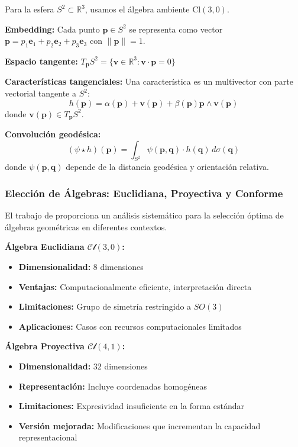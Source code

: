 \begin{example}\label{ex:cnn_sphere_clifford}
Para la esfera $S^2 \subset \mathbb{R}^3$, usamos el álgebra ambiente $\text{Cl}(3,0)$.

\textbf{Embedding:}
Cada punto $\mathbf{p} \in S^2$ se representa como vector $\mathbf{p} = p_1 \mathbf{e}_1 + p_2 \mathbf{e}_2 + p_3 \mathbf{e}_3$ con $\|\mathbf{p}\| = 1$.

\textbf{Espacio tangente:}
$T_\mathbf{p} S^2 = \{\mathbf{v} \in \mathbb{R}^3 : \mathbf{v} \cdot \mathbf{p} = 0\}$

\textbf{Características tangenciales:}
Una característica es un multivector con parte vectorial tangente a $S^2$:
\[h(\mathbf{p}) = \alpha(\mathbf{p}) + \mathbf{v}(\mathbf{p}) + \beta(\mathbf{p}) \mathbf{p} \wedge \mathbf{v}(\mathbf{p})\]
donde $\mathbf{v}(\mathbf{p}) \in T_\mathbf{p} S^2$.

\textbf{Convolución geodésica:}
\[(\psi \star h)(\mathbf{p}) = \int_{S^2} \psi(\mathbf{p}, \mathbf{q}) \cdot h(\mathbf{q}) \, d\sigma(\mathbf{q})\]
donde $\psi(\mathbf{p}, \mathbf{q})$ depende de la distancia geodésica y orientación relativa.
\end{example}

\subsubsection{Elección de Álgebras: Euclidiana, Proyectiva y Conforme}

El trabajo de \citet{dehaan2024euclidean} proporciona un análisis sistemático para la selección óptima de álgebras geométricas en diferentes contextos.

\textbf{Álgebra Euclidiana $\mathcal{Cl}(3,0)$:}
\begin{itemize}
    \item \textbf{Dimensionalidad:} 8 dimensiones
    \item \textbf{Ventajas:} Computacionalmente eficiente, interpretación directa
    \item \textbf{Limitaciones:} Grupo de simetría restringido a $SO(3)$
    \item \textbf{Aplicaciones:} Casos con recursos computacionales limitados
\end{itemize}

\textbf{Álgebra Proyectiva $\mathcal{Cl}(4,1)$:}
\begin{itemize}
    \item \textbf{Dimensionalidad:} 32 dimensiones
    \item \textbf{Representación:} Incluye coordenadas homogéneas
    \item \textbf{Limitaciones:} Expresividad insuficiente en la forma estándar
    \item \textbf{Versión mejorada:} Modificaciones que incrementan la capacidad representacional
\end{itemize}

